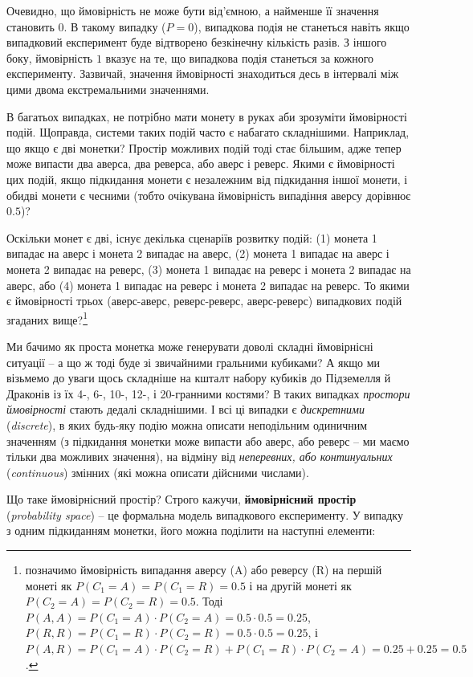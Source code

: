 \documentclass[
  11pt,
]{book}
\begin{document}
Очевидно, що ймовірність не може бути від'ємною, а найменше її значення становить \(0\). В такому випадку (\(P = 0\)), випадкова подія не станеться навіть якщо випадковий експеримент буде відтворено безкінечну кількість разів. З іншого боку, ймовірність \(1\) вказує на те, що випадкова подія станеться за кожного експерименту. Зазвичай, значення ймовірності знаходиться десь в інтервалі між цими двома екстремальними значеннями.

В багатьох випадках, не потрібно мати монету в руках аби зрозуміти ймовірності подій. Щоправда, системи таких подій часто є набагато складнішими. Наприклад, що якщо є дві монетки? Простір можливих подій тоді стає більшим, адже тепер може випасти два аверса, два реверса, або аверс і реверс. Якими є ймовірності цих подій, якщо підкидання монети є незалежним від підкидання іншої монети, і обидві монети є чесними (тобто очікувана ймовірність випадіння аверсу дорівнює \(0.5\))?

Оскільки монет є дві, існує декілька сценаріїв розвитку подій: (1) монета 1 випадає на аверс і монета 2 випадає на аверс, (2) монета 1 випадає на аверс і монета 2 випадає на реверс, (3) монета 1 випадає на реверс і монета 2 випадає на аверс, або (4) монета 1 випадає на реверс і монета 2 випадає на реверс. То якими є ймовірності трьох (аверс-аверс, реверс-реверс, аверс-реверс) випадкових подій згаданих вище?\footnote{позначимо ймовірність випадання аверсу (A) або реверсу (R) на першій монеті як \(P(C_1 = A) = P(C_1 = R) = 0.5\) і на другій монеті як \(P(C_2 = A) = P(C_2 = R) = 0.5\). Тоді \(P(A, A) = P(C_1 = A) \cdot P(C_2 =  A) = 0.5 \cdot 0.5 = 0.25\), \(P(R, R) = P(C_1 = R) \cdot P(C_2 =  R) = 0.5 \cdot 0.5 = 0.25\), і \(P(A, R) = P(C_1 = A) \cdot P(C_2 = R) + P(C_1 = R) \cdot P(C_2 = A) = 0.25 + 0.25 = 0.5\).}

Ми бачимо як проста монетка може генерувати доволі складні ймовірнісні ситуації -- а що ж тоді буде зі звичайними гральними кубиками? А якщо ми візьмемо до уваги щось складніше на кшталт набору кубиків до Підземелля й Драконів із їх 4-, 6-, 10-, 12-, і 20-гранними костями? В таких випадках \emph{простори ймовірності} стають дедалі складнішими. І всі ці випадки є \emph{дискретними} (\emph{discrete}), в яких будь-яку подію можна описати неподільним одиничним значенням (з підкидання монетки може випасти або аверс, або реверс -- ми маємо тільки два можливих значення), на відміну від \emph{неперевних, або континуальних} (\emph{continuous}) змінних (які можна описати дійсними числами).

Що таке ймовірнісний простір? Строго кажучи, \textbf{ймовірнісний простір} (\emph{probability space}) -- це формальна модель випадкового експерименту. У випадку з одним підкиданням монетки, його можна поділити на наступні елементи:
\end{document}
